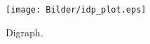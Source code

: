 \documentclass{article}
\begin{document}
\pagestyle{empty}



\begin{figure}[!htb]
\centering
\texttt{[image: Bilder/idp\_plot.eps]}
\caption{Digraph.}
\label{fig:digraph}
\end{figure}
\end{document}
